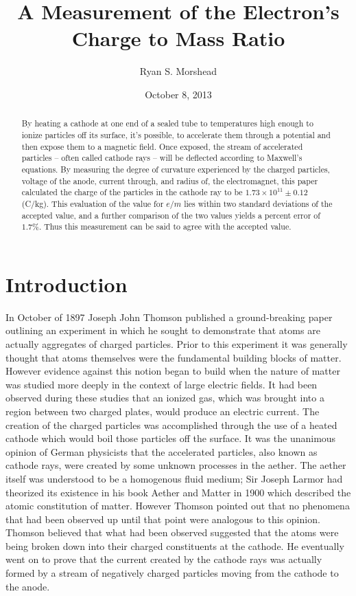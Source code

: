 \documentclass[prb,preprint]{revtex4-1}
\begin{document}
\title{A Measurement of the Electron's Charge to Mass Ratio}

\author{Ryan S. Morshead}

\date{October 8, 2013}

\begin{abstract}
By heating a cathode at one end of a sealed tube to temperatures high enough to ionize particles off its surface, it's possible, to accelerate them through a potential and then expose them to a magnetic field. Once exposed, the stream of accelerated particles -- often called cathode rays -- will be deflected according to Maxwell's equations. By measuring the degree of curvature experienced by the charged particles, voltage of the anode, current through, and radius of, the electromagnet, this paper calculated the charge of the particles in the cathode ray to be $1.73\times10^{11}\pm0.12$ (C/kg). This evaluation of the value for $e/m$ lies within two standard deviations of the accepted value, and a further comparison of the two values yields a percent error of $1.7\%$. Thus this measurement can be said to agree with the accepted value.
\end{abstract}


\maketitle


\section{Introduction}

In October of 1897 Joseph John Thomson published a ground-breaking paper outlining an experiment in which he sought to demonstrate that atoms are actually aggregates of charged particles\cite{jjt}. Prior to this experiment it was generally thought that atoms themselves were the fundamental building blocks of matter. However evidence against this notion began to build when the nature of matter was studied more deeply in the context of large electric fields. It had been observed during these studies that an ionized gas, which was brought into a region between two charged plates, would produce an electric current. The creation of the charged particles was accomplished through the use of a heated cathode which would boil those particles off the surface. It was the unanimous opinion of German physicists that the accelerated particles, also known as cathode rays, were created by some unknown processes in the aether\cite{jjt}. The aether itself was understood to be a homogenous fluid medium; Sir Joseph Larmor had theorized its existence in his book Aether and Matter in 1900 which described the atomic constitution of matter. However Thomson pointed out that no phenomena that had been observed up until that point were analogous to this opinion. Thomson believed that what had been observed suggested that the atoms were being broken down into their charged constituents at the cathode. He eventually went on to prove that the current created by the cathode rays was actually formed by a stream of negatively charged particles moving from the cathode to the anode.
\end{document}
